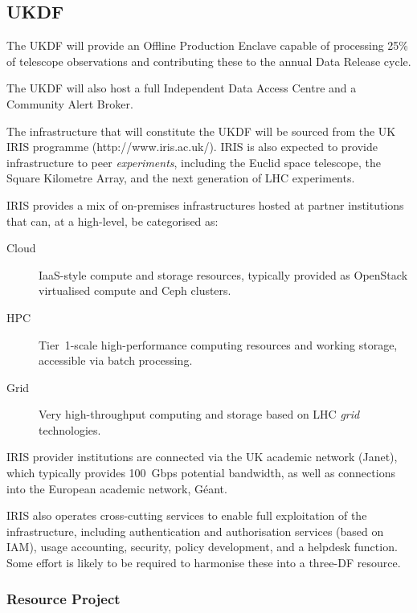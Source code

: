 \subsection{UKDF}

The UKDF will provide an Offline Production Enclave capable of processing 25\% of telescope observations and contributing these to the annual Data Release cycle.

The UKDF will also host a full Independent Data Access Centre and a Community Alert Broker.

The infrastructure that will constitute the UKDF will be sourced from the UK IRIS programme (http://www.iris.ac.uk/). IRIS is also expected to provide infrastructure to peer {\em experiments}, including the Euclid space telescope, the Square Kilometre Array, and the next generation of LHC experiments.

IRIS provides a mix of on-premises infrastructures hosted at partner institutions that can, at a high-level, be categorised as:

\begin{description}

\item[Cloud] IaaS-style compute and storage resources, typically provided as OpenStack virtualised compute and Ceph clusters.

\item[HPC] Tier~1-scale high-performance computing resources and working storage, accessible via  batch processing.

\item[Grid] Very high-throughput computing and storage based on LHC {\em grid} technologies.
  
\end{description}

IRIS provider institutions are connected via the UK academic network (Janet), which typically provides 100~Gbps potential bandwidth, as well as connections into the European academic network, G\'eant. 

IRIS also operates cross-cutting services to enable full exploitation of the infrastructure, including authentication and authorisation services (based on  IAM), usage accounting, security, policy development, and a helpdesk function. Some effort is likely to be required to harmonise these into a three-DF resource.

\subsubsection{Resource Project}

